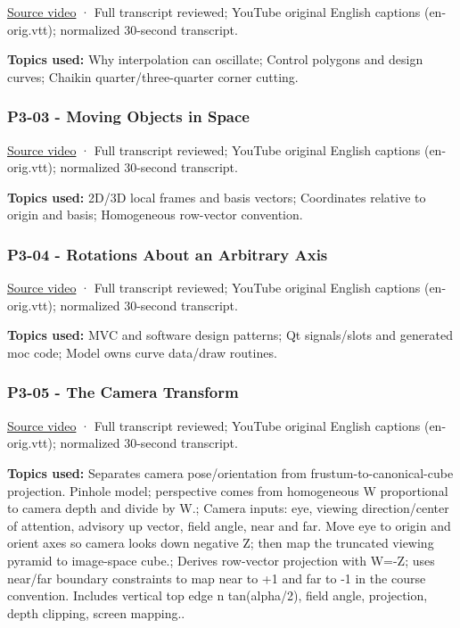 \href{https://www.youtube.com/watch?v=0NbD-c0Ctdk}{Source video} · Full transcript reviewed; YouTube original English captions (en-orig.vtt); normalized 30-second transcript.

\textbf{Topics used:} Why interpolation can oscillate; Control polygons and design curves; Chaikin quarter/three-quarter corner cutting.

\subsubsection{P3-03 - Moving Objects in Space}\label{04-visual-computing-ii-ch036-p3-03---moving-objects-in-space}

\href{https://www.youtube.com/watch?v=wArGifkRD2A}{Source video} · Full transcript reviewed; YouTube original English captions (en-orig.vtt); normalized 30-second transcript.

\textbf{Topics used:} 2D/3D local frames and basis vectors; Coordinates relative to origin and basis; Homogeneous row-vector convention.

\subsubsection{P3-04 - Rotations About an Arbitrary Axis}\label{04-visual-computing-ii-ch036-p3-04---rotations-about-an-arbitrary-axis}

\href{https://www.youtube.com/watch?v=gRVxv8kWl0Q}{Source video} · Full transcript reviewed; YouTube original English captions (en-orig.vtt); normalized 30-second transcript.

\textbf{Topics used:} MVC and software design patterns; Qt signals/slots and generated moc code; Model owns curve data/draw routines.

\subsubsection{P3-05 - The Camera Transform}\label{04-visual-computing-ii-ch036-p3-05---the-camera-transform}

\href{https://www.youtube.com/watch?v=mpTl003EXCY}{Source video} · Full transcript reviewed; YouTube original English captions (en-orig.vtt); normalized 30-second transcript.

\textbf{Topics used:} Separates camera pose/orientation from frustum-to-canonical-cube projection. Pinhole model; perspective comes from homogeneous W proportional to camera depth and divide by W.; Camera inputs: eye, viewing direction/center of attention, advisory up vector, field angle, near and far. Move eye to origin and orient axes so camera looks down negative Z; then map the truncated viewing pyramid to image-space cube.; Derives row-vector projection with W=-Z; uses near/far boundary constraints to map near to +1 and far to -1 in the course convention. Includes vertical top edge n tan(alpha/2), field angle, projection, depth clipping, screen mapping..

